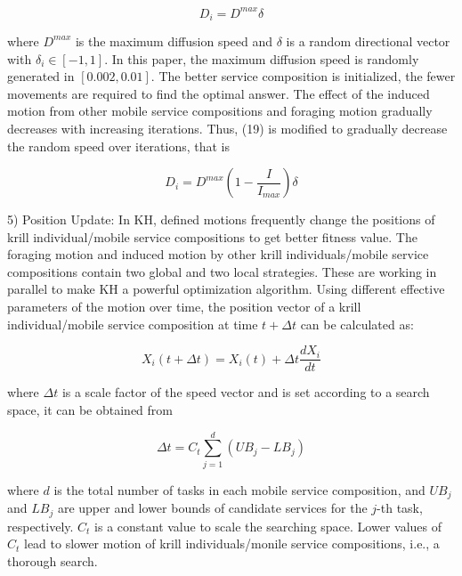 \begin{equation}
D_i = D^{max}\delta
\end{equation}

where $D^{max}$ is the maximum diffusion speed and $\delta$ is a random directional vector with $\delta_i \in [−1, 1]$. In this paper, the maximum diffusion speed is randomly generated in $[0.002, 0.01]$. The better service composition is initialized, the fewer movements are required to find the optimal answer. The effect of the induced motion from other mobile service compositions and foraging motion gradually decreases with increasing iterations. Thus, (19) is modified to gradually decrease the random speed over iterations, that is

\begin{equation}
D_i = D^{max}(1-\frac{I}{I_{max}})\delta
\end{equation}

5) Position Update: In KH, defined motions frequently change the positions of krill individual/mobile service compositions to get better fitness value. The foraging motion and induced motion by other krill individuals/mobile service compositions contain two global and two local strategies. These are working in parallel to make KH a powerful optimization algorithm. Using different effective parameters of the motion over time, the position vector of a krill individual/mobile service composition at time $t + \Delta t$ can be calculated as:

\begin{equation}
X_i(t+\Delta t) = X_i(t) + \Delta t \frac{dX_i}{dt}
\end{equation}

where $\Delta t$ is a scale factor of the speed vector and is set according to a search space, it can be obtained from

\begin{equation}
\Delta t = C_t\sum_{j=1}^{d}(UB_j - LB_j)
\end{equation}

where $d$ is the total number of tasks in each mobile service composition, and $UB_j$ and $LB_j$ are upper and lower bounds of candidate services for the $j$-th task, respectively. $C_t$ is a constant value to scale the searching space. Lower values of $C_t$ lead to slower motion of krill individuals/monile service compositions, i.e., a thorough search.
